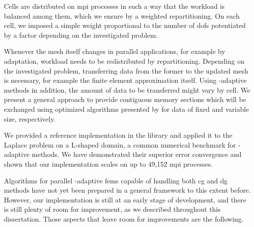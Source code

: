 Cells are distributed on \gls{mpi} processes in such a way that the workload is balanced among them, which we ensure by a weighted repartitioning. On each cell, we imposed a simple weight proportional to the number of \glspl{dof} potentiated by a factor depending on the investigated problem.

Whenever the mesh itself changes in parallel applications, for example by adaptation, workload needs to be redistributed by repartitioning. Depending on the investigated problem, transferring data from the former to the updated mesh is necessary, for example the finite element approximation itself. Using \hp-adaptive methods in addition, the amount of data to be transferred might vary by cell. We present a general approach to provide contiguous memory sections which will be exchanged using optimized algorithms presented by \textcite{burstedde2018} for data of fixed and variable size, respectively.



We provided a reference implementation in the \dealii{} library and applied it to the Laplace problem on a L-shaped domain, a common numerical benchmark for \hp-adaptive methods. We have demonstrated their superior error convergence and shown that our implementation scales on up to 49,152 \gls{mpi} processes.




Algorithms for parallel \hp-adaptive \glspl{fem} capable of handling both \gls{cg} and \gls{dg} methods have not yet been prepared in a general framework to this extent before. However, our implementation is still at an early stage of development, and there is still plenty of room for improvement, as we described throughout this dissertation. Those aspects that leave room for improvements are the following.

